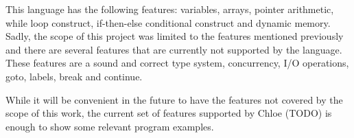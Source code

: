 This language has the following features: variables, arrays, pointer arithmetic, while loop construct, if-then-else conditional construct and dynamic memory.
Sadly, the scope of this project was limited to the features mentioned previously and there are several features that are currently not supported by the language.
These features are a sound and correct type system, concurrency, I/O operations, goto, labels, break and continue.

While it will be convenient in the future to have the features not covered by the scope of this work, the current set of features supported by Chloe (TODO) is enough to show some relevant program examples.

\begin{comment}
The language should probably have a name.
I have to give one to it.
Here I write what kind of features my language has.
Variables, loops, functions, pointers, etc.
And the features I do not support.
Concurrency, types, etc.
\end{comment}
